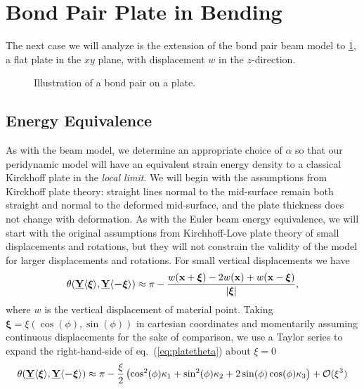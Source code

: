 \section{Bond Pair Plate in Bending}
The next case we will analyze is the extension of the bond pair beam model to \cref{fig:BondPairPlate}, a flat plate in the \(xy\) plane, with displacement $w$ in the \(z\)-direction. 
%
\begin{figure}[tbp]
    \centering
    \caption{Illustration of a bond pair on a plate.}
    \label{fig:BondPairPlate}
\end{figure}
%

\subsection{Energy Equivalence}
%
As with the beam model, we determine an appropriate choice of $\alpha$ so that our peridynamic model will have an equivalent strain energy density to a classical Kirckhoff plate in the \emph{local limit}.  We will begin with the assumptions from Kirckhoff plate theory: straight lines normal to the mid-surface remain both straight and normal to the deformed mid-surface, and the plate thickness does not change with deformation.  As with the Euler beam energy equivalence, we will start with the original assumptions from Kirchhoff-Love plate theory of small displacements and rotations, but they will not constrain the validity of the model for larger displacements and rotations.  For small vertical displacements we have
%
\begin{equation}
    \theta(\vstate{Y}{}{\boldsymbol{\xi}},\vstate{Y}{}{\boldsymbol{-\xi}}) \approx \pi-\frac{w(\mathbf{x}+\boldsymbol{\xi})-2w(\mathbf{x})+w(\mathbf{x}-\boldsymbol{\xi})}{|\boldsymbol{\xi}|},
    \label{eq:platetheta}
\end{equation}
%
where $w$ is the vertical displacement of material point.  Taking \(\boldsymbol{\xi}=\xi (\cos(\phi),\sin(\phi))\) in cartesian coordinates and momentarily assuming continuous displacements for the sake of comparison, we use a Taylor series to expand the right-hand-side of eq.~(\ref{eq:platetheta}) about \(\xi = 0\) 
%
\begin{equation}
    \theta(\vstate{Y}{}{\boldsymbol{\xi}},\vstate{Y}{}{\boldsymbol{-\xi}}) \approx \pi-\frac{\xi}{2} \left(\cos^2(\phi) \kappa_1+\sin^2(\phi) \kappa_2+2\sin(\phi)\cos(\phi)\kappa_3\right)+\mathcal{O}(\xi^3)
    \label{eq:platetheta2}
\end{equation}
